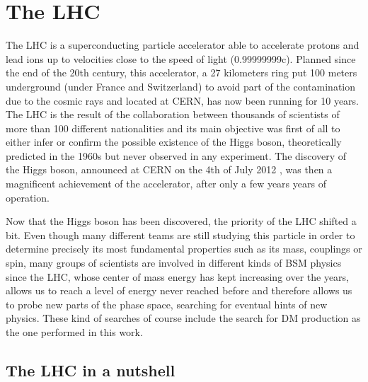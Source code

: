\documentclass[a4paper, 10pt, openright]{report}
\begin{document}
\section{The \acf{LHC}} \label{section:LHC}

The \acf{LHC} is a superconducting particle accelerator able to accelerate protons and lead ions up to velocities close to the speed of light (0.99999999c). Planned since the end of the 20th century, this accelerator, a 27 kilometers ring put 100 meters underground (under France and Switzerland) to avoid part of the contamination due to the cosmic rays and located at \ac{CERN}, has now been running for 10 years. The \ac{LHC} is the result of the collaboration between thousands of scientists of more than 100 different nationalities and its main objective was first of all to either infer or confirm the possible existence of the Higgs boson, theoretically predicted in the 1960s \cite{HiggsPostulate1, HiggsPostulate2} but never observed in any experiment. The discovery of the Higgs boson, announced at \ac{CERN} on the 4th of July 2012 \cite{HiggsDiscovery1, HiggsDiscovery2}, was then a magnificent achievement of the accelerator, after only a few years years of operation.

Now that the Higgs boson has been discovered, the priority of the \ac{LHC} shifted a bit. Even though many different teams are still studying this particle in order to determine precisely its most fundamental properties such as its mass, couplings or spin, many groups of scientists are involved in different kinds of \ac{BSM} physics since the \ac{LHC}, whose center of mass energy has kept increasing over the years, allows us to reach a level of energy never reached before and therefore allows us to probe new parts of the phase space, searching for eventual hints of new physics. These kind of searches of course include the search for \ac{DM} production as the one performed in this work. 


\subsection{The \acs{LHC} in a nutshell}\label{section:LHCNut}
\end{document}
